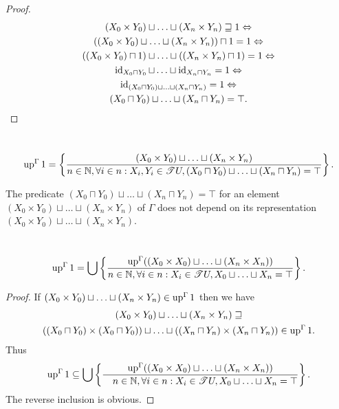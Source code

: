 \begin{proof}
\begin{multline*}
  (X_0 \times Y_0) \sqcup \ldots \sqcup (X_n \times Y_n) \sqsupseteq 1
  \Leftrightarrow \\ ((X_0 \times Y_0) \sqcup \ldots \sqcup (X_n \times Y_n))
  \sqcap 1 = 1 \Leftrightarrow \\ ((X_0 \times Y_0) \sqcap 1) \sqcup \ldots
  \sqcup ((X_n \times Y_n) \sqcap 1) = 1 \Leftrightarrow \\ \operatorname{id}_{X_0 \sqcap
  Y_0} \sqcup \ldots \sqcup \operatorname{id}_{X_n \sqcap Y_n} = 1 \Leftrightarrow \\
  \operatorname{id}_{(X_0 \sqcap Y_0) \sqcup \ldots \sqcup (X_n \sqcap Y_n)} = 1
  \Leftrightarrow \\ (X_0 \sqcap Y_0) \sqcup \ldots \sqcup (X_n \sqcap Y_n) =
  \top.
\end{multline*}
\end{proof}

\begin{cor}
  ~
  \[ \operatorname{up}^{\Gamma} 1 = \left\{ \frac{ (X_0 \times Y_0) \sqcup \ldots \sqcup (X_n
     \times Y_n) }{ n \in \mathbb{N}, \forall i \in
     n : X_i, Y_i \in \mathscr{T} U, (X_0 \sqcap Y_0) \sqcup \ldots \sqcup
     (X_n \sqcap Y_n) = \top }\right\} . \]
\end{cor}

\begin{cor}
  The predicate
  $(X_0 \sqcap Y_0) \sqcup \ldots \sqcup (X_n \sqcap Y_n) = \top$ for an
  element $(X_0 \times Y_0) \sqcup \ldots \sqcup (X_n \times Y_n)$ of $\Gamma$
  does not depend on its representation $(X_0 \times Y_0) \sqcup \ldots \sqcup
  (X_n \times Y_n)$.
\end{cor}

\begin{prop}
  ~
  \[ \operatorname{up}^{\Gamma} 1 = \bigcup \left\{ \frac{ \operatorname{up}^{\Gamma} ((X_0 \times
     X_0) \sqcup \ldots \sqcup (X_n \times X_n)) }{ n
     \in \mathbb{N}, \forall i \in n : X_i \in \mathscr{T} U, X_0 \sqcup
     \ldots \sqcup X_n = \top }\right\} . \]
\end{prop}

\begin{proof}
  If $(X_0 \times Y_0) \sqcup \ldots \sqcup (X_n \times Y_n) \in
  \operatorname{up}^{\Gamma} 1$ then we have
\begin{multline*}
  (X_0 \times Y_0) \sqcup \ldots \sqcup (X_n \times Y_n) \sqsupseteq \\ ((X_0
     \sqcap Y_0) \times (X_0 \sqcap Y_0)) \sqcup \ldots \sqcup ((X_n \sqcap
     Y_n) \times (X_n \sqcap Y_n)) \in \operatorname{up}^{\Gamma} 1.
\end{multline*}
  Thus
  \[ \operatorname{up}^{\Gamma} 1 \subseteq \bigcup \left\{ \frac{ \operatorname{up}^{\Gamma} ((X_0
     \times X_0) \sqcup \ldots \sqcup (X_n \times X_n)) }{
     \hspace{1em} n \in \mathbb{N}, \forall i \in n : X_i \in \mathscr{T} U,
     X_0 \sqcup \ldots \sqcup X_n = \top }\right\} . \]
  The reverse inclusion is obvious.
\end{proof}

